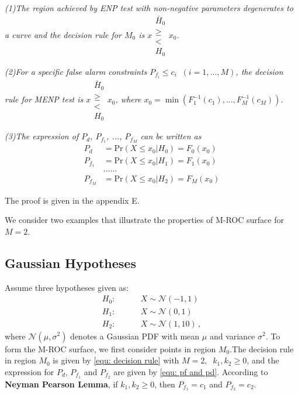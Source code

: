 \documentclass[12pt,journal,a4paper,twoside,onecolumn]{IEEEtran}
\begin{document}
\begin{spacing}{2.5}
\textit{(1)The region achieved by ENP test with non-negative parameters degenerates to a curve and the decision rule for $M_0$ is $x \substack{\bar{H}_0 \\ \geq \\ < \\H_0} x_0$.}

\textit{(2)For a specific false alarm constraints $P_{f_i} \leq c_i\;\;(i = 1, ..., M)$, the decision rule for MENP test is $x \substack{\bar{H}_0 \\ \geq \\ < \\H_0} x_0$, where $x_0 = \min(F_1^{-1}(c_1), ..., F_M^{-1}(c_M))$.}

\textit{(3)The expression of $P_d$, $P_{f_1}$, ..., $P_{f_M}$ can be written as}
\begin{equation}
\label{equ: chi pd}
  \begin{split}
    P_d &= \text{Pr}(X \leq x_0 | H_0) = F_0(x_0)\\
        P_{f_1} &= \text{Pr}(X \leq x_0 | H_1) = F_1(x_0)\\
        &......\\
            P_{f_M} &= \text{Pr}(X \leq x_0 | H_2) = F_M(x_0)
  \end{split}
\end{equation}

The proof is given in the appendix E.

We consider two examples that illustrate the properties of M-ROC surface for $M = 2$.

\subsection{Gaussian Hypotheses}
Assume three hypotheses given as:
\begin{equation}
\label{equ: Gaussian Hypothesis}
\begin{split}
	H_0:\;\;\;\;\;\;\;\;&X \sim \mathcal{N}(-1,1)\\
    H_1:\;\;\;\;\;\;\;\;&X \sim \mathcal{N}(0,1)\\
    H_2:\;\;\;\;\;\;\;\;&X \sim \mathcal{N}(1,10)\,,
\end{split}
\end{equation}
where $\mathcal{N}(\mu,\sigma^2)$ denotes a Gaussian PDF with mean $\mu$ and variance $\sigma^2$.
To form the M-ROC surface, we first consider points in region $M_0$.The decision rule in region $M_0$ is given by \eqref{equ: decision rule}
with $M=2,\;\;k_1, k_2 \geq 0$, and the expression for $P_d$, $P_{f_1}$ and $P_{f_2}$ are given by \eqref{equ: pf and pd}. According to \textbf{Neyman Pearson Lemma}, if $k_1, k_2 \geq 0$, then $P_{f_1} = c_1$ and $P_{f_2} = c_2$.


\end{spacing}
\end{document}
